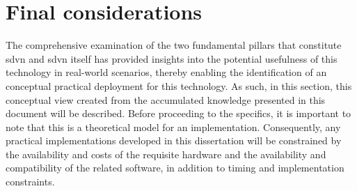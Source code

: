 \section{Final considerations} %
\label{sec:final_considerations}

The comprehensive examination of the two fundamental pillars that constitute \gls{sdvn} and \gls{sdvn} itself has provided insights into the potential usefulness of this technology in real-world scenarios, thereby enabling the identification of an conceptual practical deployment for this technology. As such, in this section, this conceptual view created from the accumulated knowledge presented in this document will be described.
Before proceeding to the specifics, it is important to note that this is a theoretical model for an implementation. Consequently, any practical implementations developed in this dissertation will be constrained by the availability and costs of the requisite hardware and the availability and compatibility of the related software, in addition to timing and implementation constraints.    

